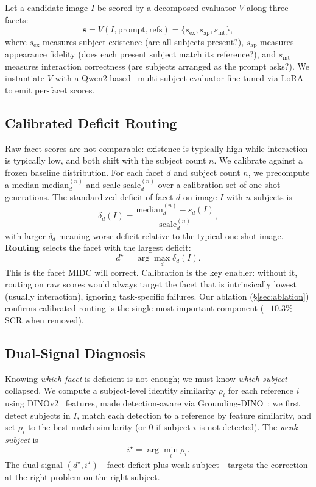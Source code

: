 \documentclass[letterpaper]{article}
\begin{document}
Let a candidate image $I$ be scored by a decomposed evaluator $V$ along three facets:
\[
\mathbf{s} = V(I, \text{prompt}, \text{refs}) = \{s_{\mathrm{ex}}, s_{\mathrm{ap}}, s_{\mathrm{int}}\},
\]
where $s_{\mathrm{ex}}$ measures subject existence (are all subjects present?), $s_{\mathrm{ap}}$ measures appearance fidelity (does each present subject match its reference?), and $s_{\mathrm{int}}$ measures interaction correctness (are subjects arranged as the prompt asks?). We instantiate $V$ with a Qwen2-based~\citep{yang2024qwen2} multi-subject evaluator fine-tuned via LoRA~\citep{hu2021lora,unsloth2024} to emit per-facet scores.

\subsection{Calibrated Deficit Routing}
\label{sec:routing}

Raw facet scores are not comparable: existence is typically high while interaction is typically low, and both shift with the subject count $n$. We calibrate against a frozen baseline distribution. For each facet $d$ and subject count $n$, we precompute a median $\mathrm{median}_d^{(n)}$ and scale $\mathrm{scale}_d^{(n)}$ over a calibration set of one-shot generations. The standardized deficit of facet $d$ on image $I$ with $n$ subjects is
\[
\delta_d(I) = \frac{\mathrm{median}_d^{(n)} - s_d(I)}{\mathrm{scale}_d^{(n)}},
\]
with larger $\delta_d$ meaning worse deficit relative to the typical one-shot image. \textbf{Routing} selects the facet with the largest deficit:
\[
d^\star = \arg\max_d \delta_d(I).
\]
This is the facet MIDC will correct. Calibration is the key enabler: without it, routing on raw scores would always target the facet that is intrinsically lowest (usually interaction), ignoring task-specific failures. Our ablation (\S\ref{sec:ablation}) confirms calibrated routing is the single most important component ($+10.3\%$ SCR when removed).

\subsection{Dual-Signal Diagnosis}
\label{sec:dual}

Knowing \emph{which facet} is deficient is not enough; we must know \emph{which subject} collapsed. We compute a subject-level identity similarity $\rho_i$ for each reference $i$ using DINOv2~\citep{oquab2023dinov2} features, made detection-aware via Grounding-DINO~\citep{liu2023grounding}: we first detect subjects in $I$, match each detection to a reference by feature similarity, and set $\rho_i$ to the best-match similarity (or $0$ if subject $i$ is not detected). The \emph{weak subject} is
\[
i^\star = \arg\min_i \rho_i.
\]
The dual signal $(d^\star, i^\star)$---facet deficit plus weak subject---targets the correction at the right problem on the right subject.
\end{document}
